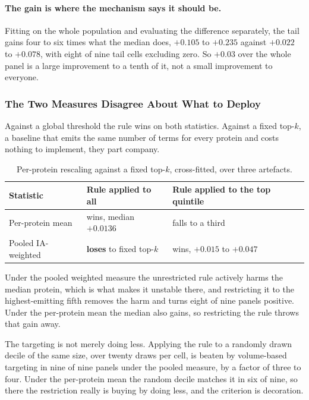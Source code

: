 \paragraph{The gain is where the mechanism says it should be.} Fitting on the
whole population and evaluating the difference separately, the tail gains four
to six times what the median does, $+0.105$ to $+0.235$ against $+0.022$ to
$+0.078$, with eight of nine tail cells excluding zero. So $+0.03$ over the
whole panel is a large improvement to a tenth of it, not a small improvement to
everyone.

\subsubsection{The Two Measures Disagree About What to Deploy}

Against a global threshold the rule wins on both statistics. Against a fixed
top-$k$, a baseline that emits the same number of terms for every protein and
costs nothing to implement, they part company.

\begin{table}[htbp]
\centering
\caption{Per-protein rescaling against a fixed top-$k$, cross-fitted, over
three artefacts.}
\label{tab:exp17-metrics}
\begin{tabular}{lll}
\toprule
Statistic & Rule applied to all & Rule applied to the top quintile \\
\midrule
Per-protein mean & wins, median $+0.0136$ & falls to a third \\
Pooled IA-weighted & \textbf{loses} to fixed top-$k$ & wins, $+0.015$ to $+0.047$ \\
\bottomrule
\end{tabular}
\end{table}

Under the pooled weighted measure the unrestricted rule actively harms the
median protein, which is what makes it unstable there, and restricting it to
the highest-emitting fifth removes the harm and turns eight of nine panels
positive. Under the per-protein mean the median also gains, so restricting the
rule throws that gain away.

The targeting is not merely doing less. Applying the rule to a randomly drawn
decile of the same size, over twenty draws per cell, is beaten by volume-based
targeting in nine of nine panels under the pooled measure, by a factor of three
to four. Under the per-protein mean the random decile matches it in six of
nine, so there the restriction really is buying by doing less, and the criterion
is decoration.

